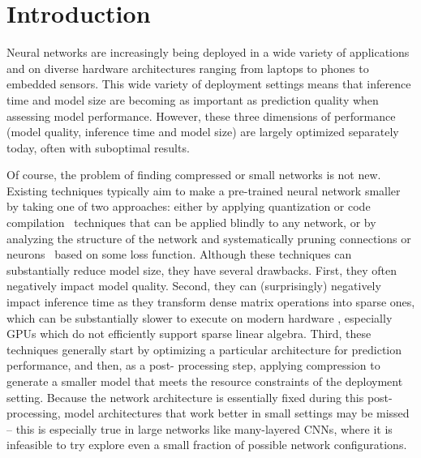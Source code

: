 
\section{Introduction}

Neural networks are increasingly being deployed in a wide variety  of
applications  and on diverse hardware architectures ranging from laptops to
phones to embedded sensors. This wide variety of deployment settings means
that inference time and model size are becoming as important as  prediction
quality when assessing model performance.  However, these three dimensions of
performance (model quality, inference time and model size)  are largely
optimized separately today, often with suboptimal results.

Of course, the problem of finding compressed or small networks is not new.
Existing techniques typically aim to make a pre-trained neural network smaller
by taking one of two approaches:  either by
applying quantization \cite{quant} or code compilation~\cite{ma2016compilation}
techniques that can be applied blindly to any network, or by analyzing the
structure of the network and systematically pruning
connections or neurons~\cite{han2015deepcompression,Cun}
based on some loss function.  Although these techniques can substantially
reduce model size, they have several drawbacks.  First, they often negatively
impact model quality.  Second, they can (surprisingly) negatively impact
inference time as they transform dense matrix operations into sparse ones,
which can be substantially slower to execute on modern hardware
\cite{han2015deepcompression}, especially GPUs which do not efficiently support sparse
linear algebra.  Third, these techniques generally start by optimizing a
particular architecture for prediction performance, and then, as a post-
processing step, applying compression  to generate a smaller model that meets the
resource constraints of the deployment setting.  Because the network
architecture is essentially fixed during this post-processing,   model architectures
that work better in small settings may be missed -- this is especially true in
large networks like many-layered CNNs,  where it is infeasible to try explore
even a small fraction of possible network configurations.


